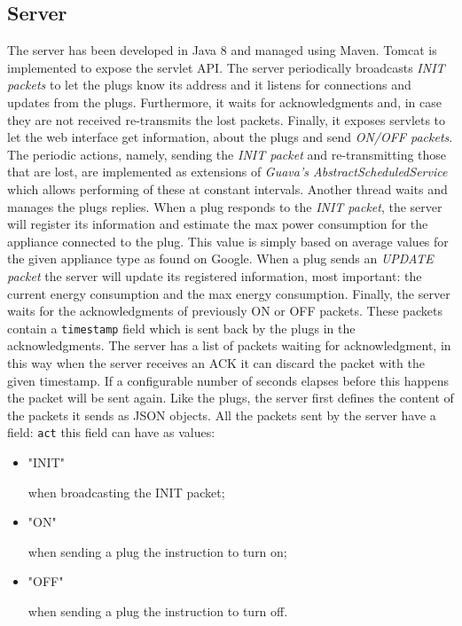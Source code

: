 \documentclass[conference]{IEEEtran}
\begin{document}
	\subsection{Server}\label{SVR}
	The server has been developed in Java 8 and managed using Maven. Tomcat is implemented to expose the servlet API. The server periodically broadcasts \textit{INIT packets} to let the plugs know its address and it listens for connections and updates from the plugs. Furthermore, it waits for acknowledgments and, in case they are not received re-transmits the lost packets. Finally, it exposes servlets to let the web interface get information, about the plugs and send \textit{ON/OFF packets}. The periodic actions, namely, sending the \textit{INIT packet} and re-transmitting those that are lost, are implemented as extensions of \textit{Guava's AbstractScheduledService} which allows performing of these at constant intervals. Another thread waits and manages the plugs replies. When a plug responds to the \textit{INIT packet}, the server will register its information and estimate the max power consumption for the appliance connected to the plug. This value is simply based on average values for the given appliance type as found on Google. When a plug sends an \textit{UPDATE packet} the server will update its registered information, most important: the current energy consumption and the max energy consumption. Finally, the server waits for the acknowledgments of previously ON or OFF packets. These packets contain a \verb|timestamp| field which is sent back by the plugs in the acknowledgments. The server has a list of packets waiting for acknowledgment, in this way when the server receives an ACK it can discard the packet with the given timestamp. If a configurable number of seconds elapses before this happens the packet will be sent again. Like the plugs, the server first defines the content of the packets it sends as JSON objects. All the packets sent by the server have a field: \verb|act| this field can have as values:
	\begin{itemize}
		\item \begin{spverbatim}"INIT"\end{spverbatim} when broadcasting the INIT packet;
		\item \begin{spverbatim}"ON"\end{spverbatim} when sending a plug the instruction to turn on;
		\item \begin{spverbatim}"OFF"\end{spverbatim} when sending a plug the instruction to turn off.
	\end{itemize}
\end{document}
